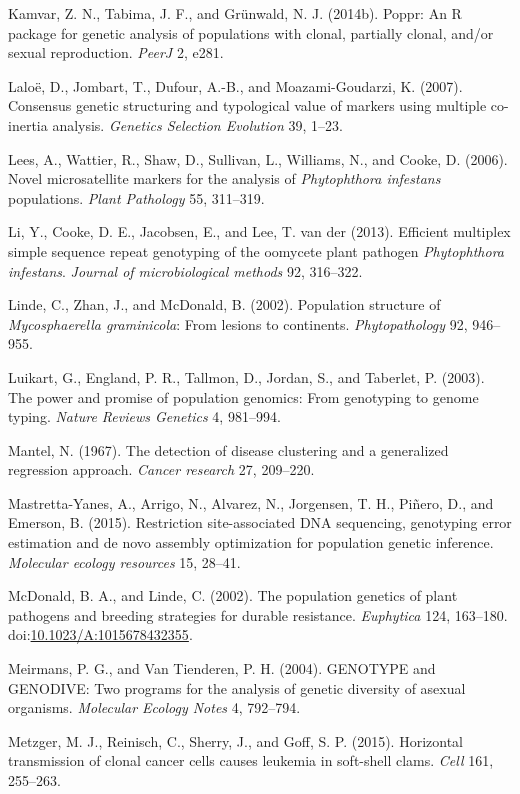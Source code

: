 \documentclass{frontiersSCNS} %
\begin{document}
Kamvar, Z. N., Tabima, J. F., and Gr{\"{u}}nwald, N. J. (2014b). Poppr: An R
package for genetic analysis of populations with clonal, partially
clonal, and/or sexual reproduction. \emph{PeerJ} 2, e281.

Lalo{\"{e}}, D., Jombart, T., Dufour, A.-B., and Moazami-Goudarzi, K.
(2007). Consensus genetic structuring and typological value of markers
using multiple co-inertia analysis. \emph{Genetics Selection Evolution}
39, 1--23.

Lees, A., Wattier, R., Shaw, D., Sullivan, L., Williams, N., and Cooke,
D. (2006). Novel microsatellite markers for the analysis of
\emph{Phytophthora infestans} populations. \emph{Plant Pathology} 55,
311--319.

Li, Y., Cooke, D. E., Jacobsen, E., and Lee, T. van der (2013).
Efficient multiplex simple sequence repeat genotyping of the oomycete
plant pathogen \emph{Phytophthora infestans}. \emph{Journal of
microbiological methods} 92, 316--322.

Linde, C., Zhan, J., and McDonald, B. (2002). Population structure of
\emph{Mycosphaerella graminicola}: From lesions to continents.
\emph{Phytopathology} 92, 946--955.

Luikart, G., England, P. R., Tallmon, D., Jordan, S., and Taberlet, P.
(2003). The power and promise of population genomics: From genotyping to
genome typing. \emph{Nature Reviews Genetics} 4, 981--994.

Mantel, N. (1967). The detection of disease clustering and a generalized
regression approach. \emph{Cancer research} 27, 209--220.

Mastretta-Yanes, A., Arrigo, N., Alvarez, N., Jorgensen, T. H.,
Pi{\~{n}}ero, D., and Emerson, B. (2015). Restriction site-associated DNA
sequencing, genotyping error estimation and de novo assembly
optimization for population genetic inference. \emph{Molecular ecology
resources} 15, 28--41.

McDonald, B. A., and Linde, C. (2002). The population genetics of plant
pathogens and breeding strategies for durable resistance.
\emph{Euphytica} 124, 163--180.
doi:\href{http://dx.doi.org/10.1023/A:1015678432355}{10.1023/A:1015678432355}.

Meirmans, P. G., and Van Tienderen, P. H. (2004). GENOTYPE and GENODIVE:
Two programs for the analysis of genetic diversity of asexual organisms.
\emph{Molecular Ecology Notes} 4, 792--794.

Metzger, M. J., Reinisch, C., Sherry, J., and Goff, S. P. (2015).
Horizontal transmission of clonal cancer cells causes leukemia in
soft-shell clams. \emph{Cell} 161, 255--263.
\end{document}
